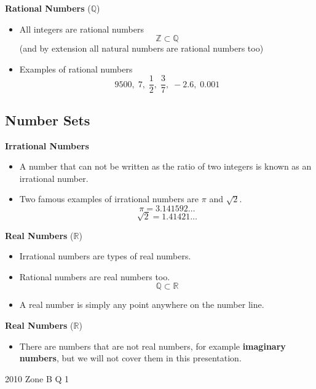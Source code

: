 \documentclass[]{report}
\begin{document}
\textbf{Rational Numbers} ($\mathbb{Q}$)
\begin{itemize}
\item All integers are rational numbers 
\[ \mathbb{Z}  \subset \mathbb{Q}\]
(and by extension all natural numbers are rational numbers too)
\item Examples of rational numbers
\[ 9500,\;7,\; \frac{1}{2} ,\; \frac{3}{7},\; -2.6 ,\; 0.001\] 
\end{itemize}


\subsection{Number Sets}

\textbf{Irrational Numbers} 
\begin{itemize}
\item A number that can not be written as the ratio of two integers is known as an irrational number.
\item Two famous examples of irrational numbers are $\pi$ and $\sqrt{2}$. 
\[\pi = 3.141592\ldots\]
\[\sqrt{2} = 1.41421\ldots\]
\end{itemize}


\textbf{Real Numbers} ($\mathbb{R}$)
\begin{itemize}
\item Irrational numbers are types of real numbers.
\item Rational numbers are real numbers too.
\[ \mathbb{Q}  \subset \mathbb{R}\]

\item A real number is simply any point anywhere on the number line.
\end{itemize}


\textbf{Real Numbers} ($\mathbb{R}$)
\begin{itemize}
\item There are numbers that are not real numbers, for example \textbf{imaginary numbers}, but we will not cover them in this presentation.
\end{itemize}


2010 Zone B Q 1
\end{document}
